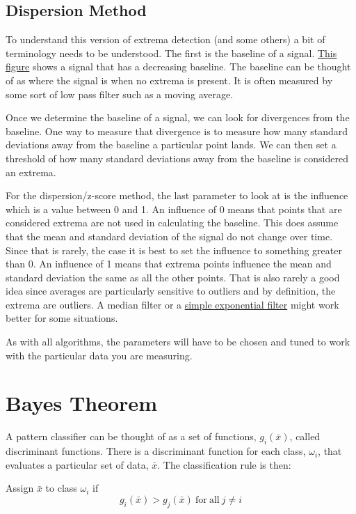 \subsection{Dispersion Method}
To understand this version of extrema detection (and some others) a bit of terminology needs to 
be understood. The first is the baseline of a signal. \href{https://bmcbioinformatics.biomedcentral.com/articles/10.1186/1471-2105-10-4/figures/2}
{This figure} shows a signal that has a decreasing baseline. The baseline can be thought of as where the 
signal is when no extrema is present. It is often measured by some sort of low pass filter such as a moving 
average. 

Once we determine the baseline of a signal, we can look for divergences from the baseline. One way to 
measure that divergence is to measure how many standard deviations away from the baseline a particular 
point lands. We can then set a threshold of how many standard deviations away from the baseline is 
considered an extrema.

For the dispersion/z-score method, the last parameter to look at is the influence which is a value 
between 0 and 1. An influence of 0 means that points that are considered extrema are not used in 
calculating the baseline. This does assume that the mean and standard deviation of the signal do 
not change over time. Since that is rarely, the case it is best to set the influence to something greater 
than 0. An influence of 1 means that extrema points influence the mean and standard deviation the 
same as all the other points. That is also rarely a good idea since averages are particularly sensitive
to outliers and by definition, the extrema are outliers. A median filter or a 
\href{https://en.wikipedia.org/wiki/Exponential\_smoothing}{simple exponential filter} might work better
for some situations.

As with all algorithms, the parameters will have to be chosen and tuned to work with the particular data 
you are measuring.

\section{Bayes Theorem}
A pattern classifier can be thought of as a set of functions, $g_i(\bar{x})$, called discriminant 
functions. There is a discriminant function for each class, $\omega_i$, that evaluates a particular 
set of data, $\bar{x}$. The classification rule is then: 

\noindent Assign $\bar{x}$ to class $\omega_i$ if 
\begin{equation}
    g_i(\bar{x}) > g_j(\bar{x})\ \mathrm{for\ all}\ j \neq i
\end{equation}


